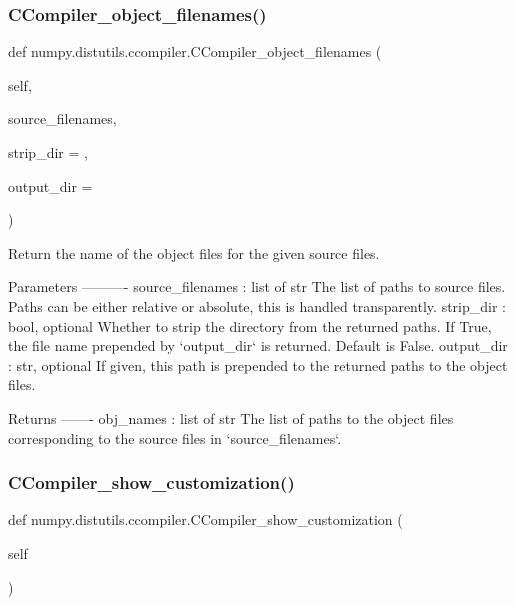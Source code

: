 \subsubsection{\texorpdfstring{C\+Compiler\+\_\+object\+\_\+filenames()}{CCompiler\_object\_filenames()}}
{\footnotesize\ttfamily def numpy.\+distutils.\+ccompiler.\+C\+Compiler\+\_\+object\+\_\+filenames (\begin{DoxyParamCaption}\item[{}]{self,  }\item[{}]{source\+\_\+filenames,  }\item[{}]{strip\+\_\+dir = {},  }\item[{}]{output\+\_\+dir = {\ttfamily \textquotesingle{}\textquotesingle{}} }\end{DoxyParamCaption})}

\begin{DoxyVerb}Return the name of the object files for the given source files.

Parameters
----------
source_filenames : list of str
    The list of paths to source files. Paths can be either relative or
    absolute, this is handled transparently.
strip_dir : bool, optional
    Whether to strip the directory from the returned paths. If True,
    the file name prepended by `output_dir` is returned. Default is False.
output_dir : str, optional
    If given, this path is prepended to the returned paths to the
    object files.

Returns
-------
obj_names : list of str
    The list of paths to the object files corresponding to the source
    files in `source_filenames`.\end{DoxyVerb}
 \mbox{\label{namespacenumpy_1_1distutils_1_1ccompiler_a44ee8712b1e71377c82f3eab1f679678}} 
\subsubsection{\texorpdfstring{C\+Compiler\+\_\+show\+\_\+customization()}{CCompiler\_show\_customization()}}
{\footnotesize\ttfamily def numpy.\+distutils.\+ccompiler.\+C\+Compiler\+\_\+show\+\_\+customization (\begin{DoxyParamCaption}\item[{}]{self }\end{DoxyParamCaption})}

